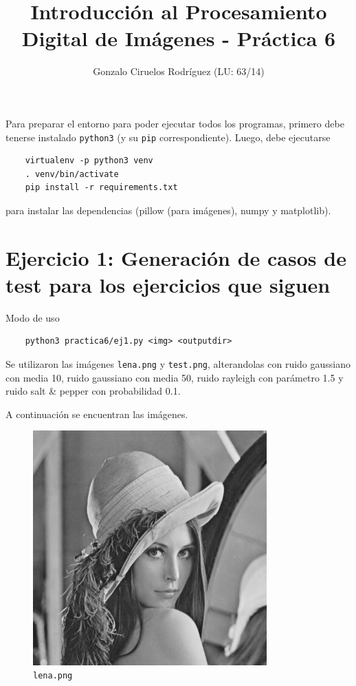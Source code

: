 \documentclass[11pt, spanish]{article}
\title{Introducción al Procesamiento Digital de Imágenes - Práctica 6}
\date{}
\author{Gonzalo Ciruelos Rodríguez (LU: 63/14)}
\begin{document}
\maketitle

Para preparar el entorno para poder ejecutar todos los programas,
primero debe tenerse instalado \texttt{python3} (y su \texttt{pip} correspondiente).
Luego, debe ejecutarse 
\begin{verbatim}
    virtualenv -p python3 venv 
    . venv/bin/activate
    pip install -r requirements.txt 
\end{verbatim}

\noindent para instalar las dependencias (pillow (para imágenes), numpy y matplotlib).



\section{Ejercicio 1: Generación de casos de test para los ejercicios que siguen}

Modo de uso
\begin{verbatim}
    python3 practica6/ej1.py <img> <outputdir>
\end{verbatim}

Se utilizaron las imágenes \texttt{lena.png} y \texttt{test.png}, alterandolas con ruido gaussiano con media 10, ruido
gaussiano con media 50, ruido rayleigh con parámetro 1.5 y ruido salt \& pepper con probabilidad 0.1.

A continuación se encuentran las imágenes.

\begin{figure}[H]
\centering
  \includegraphics[height=9cm]{ej1-imgs/lena-original.png}
  \caption{\texttt{lena.png}}
\end{figure}
\end{document}

